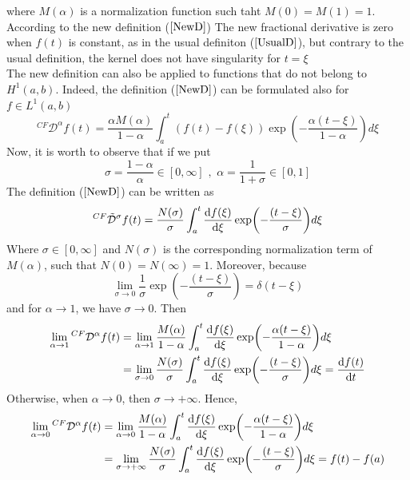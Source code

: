 \documentclass[twoside]{book}
\begin{document}
{where $M(\alpha)$ is a normalization function such taht $M(0)=M(1)=1$. According to the new definition ($\ref{NewD}$) The new fractional derivative is zero when $f(t)$ is constant, as in the usual definiton ($\ref{UsualD}$), but contrary to the usual definition, the kernel does not have singularity for $t=\xi$\\
The new definition can also be applied to functions that do not belong to $H^1(a,b)$. Indeed, the definition ($\ref{NewD}$) can be formulated also for $f \in L^1(a,b)$
\begin{equation}
    \label{NewD-Case}
    ^{CF}\mathcal{D}^{\alpha} f(t) = \frac{\alpha M(\alpha)}{1-\alpha} \int_{a}^{t} (f(t)-f(\xi)) \exp(-\frac{\alpha(t-\xi)}{1-\alpha})d\xi
\end{equation}
Now, it is worth to observe that if we put
$$\sigma = \frac{1-\alpha}{\alpha} \in [0,\infty] \,\, , \,\, \alpha = \frac{1}{1+\sigma} \in [0,1] $$
The definition ($\ref{NewD}$) can be written as
\begin{equation}
    \label{NewD-sigma}
    ^{CF}\tilde{\mathcal{D}}^{\sigma} f(t) = \frac{N(\sigma)}{\sigma} \int_a^t \dv{f(\xi) }{\xi}\exp(-\frac{(t-\xi)}{\sigma}) d\xi
\end{equation}
Where $\sigma \in [0,\infty]$ and $N(\sigma)$ is the corresponding normalization term of $M(\alpha)$, such that $N(0)=N(\infty) = 1$. Moreover, because
\begin{equation}
    \lim_{\sigma \to 0} \frac{1}{\sigma} \exp(-\frac{(t-\xi)}{\sigma}) = \delta(t-\xi)
\end{equation}
and for $\alpha \to 1$, we have $\sigma \to 0$. Then
\begin{align*}
    \lim_{\alpha \to 1} {^{CF}\mathcal{D}^{\alpha}} f(t) & = \lim_{\alpha \to 1} \frac{M(\alpha)}{1-\alpha} \int_a^t \dv{f(\xi)}{\xi} \exp(- \frac{\alpha(t-\xi)}{1-\alpha}) d\xi       \\
                                                         & = \lim_{\sigma \to 0 } \frac{N(\sigma)}{\sigma}  \int_a^t \dv{f(\xi)}{\xi} \exp(-\frac{(t-\xi)}{\sigma}) d\xi = \dv{f(t)}{t}
\end{align*}
Otherwise, when $\alpha \to 0$, then $\sigma \to +\infty$. Hence,
\begin{align*}
    \lim_{\alpha \to 0} {^{CF}\mathcal{D}^{\alpha}} f(t) & = \lim_{\alpha \to 0} \frac{M(\alpha)}{1-\alpha} \int_a^t \dv{f(\xi)}{\xi} \exp(-\frac{\alpha(t-\xi)}{1-\alpha}) d\xi           \\
                                                         & = \lim_{\sigma \to +\infty} \frac{N(\sigma)}{\sigma} \int_a^t \dv{f(\xi)}{\xi} \exp(-\frac{(t-\xi)}{\sigma}) d\xi = f(t) - f(a) \\

\end{align*}}
\end{document}

